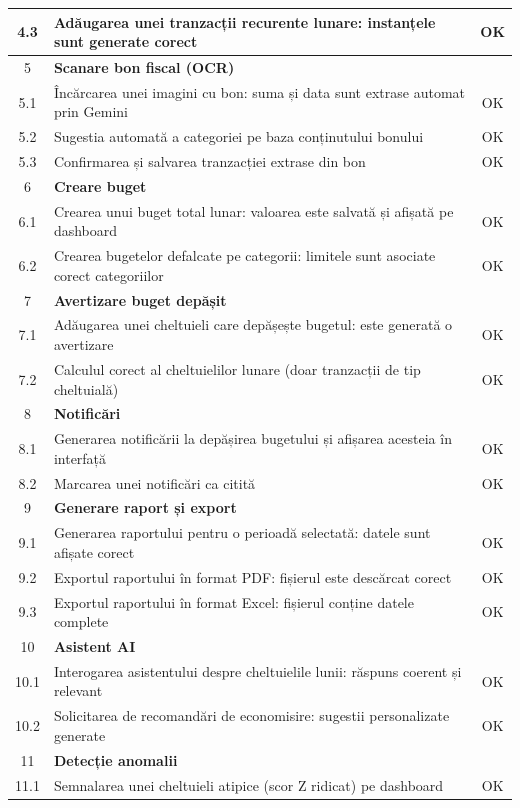 \documentclass[12pt,a4paper,oneside]{report}
\begin{document}
\begin{center}
\begin{longtable}{|c|p{11cm}|c|}
\hline
4.3 & Adăugarea unei tranzacții recurente lunare: instanțele sunt generate corect & OK \\
\hline
5 & \textbf{Scanare bon fiscal (OCR)} & \\
\hline
5.1 & Încărcarea unei imagini cu bon: suma și data sunt extrase automat prin Gemini & OK \\
\hline
5.2 & Sugestia automată a categoriei pe baza conținutului bonului & OK \\
\hline
5.3 & Confirmarea și salvarea tranzacției extrase din bon & OK \\
\hline
6 & \textbf{Creare buget} & \\
\hline
6.1 & Crearea unui buget total lunar: valoarea este salvată și afișată pe dashboard & OK \\
\hline
6.2 & Crearea bugetelor defalcate pe categorii: limitele sunt asociate corect categoriilor & OK \\
\hline
7 & \textbf{Avertizare buget depășit} & \\
\hline
7.1 & Adăugarea unei cheltuieli care depășește bugetul: este generată o avertizare & OK \\
\hline
7.2 & Calculul corect al cheltuielilor lunare (doar tranzacții de tip cheltuială) & OK \\
\hline
8 & \textbf{Notificări} & \\
\hline
8.1 & Generarea notificării la depășirea bugetului și afișarea acesteia în interfață & OK \\
\hline
8.2 & Marcarea unei notificări ca citită & OK \\
\hline
9 & \textbf{Generare raport și export} & \\
\hline
9.1 & Generarea raportului pentru o perioadă selectată: datele sunt afișate corect & OK \\
\hline
9.2 & Exportul raportului în format PDF: fișierul este descărcat corect & OK \\
\hline
9.3 & Exportul raportului în format Excel: fișierul conține datele complete & OK \\
\hline
10 & \textbf{Asistent AI} & \\
\hline
10.1 & Interogarea asistentului despre cheltuielile lunii: răspuns coerent și relevant & OK \\
\hline
10.2 & Solicitarea de recomandări de economisire: sugestii personalizate generate & OK \\
\hline
11 & \textbf{Detecție anomalii} & \\
\hline
11.1 & Semnalarea unei cheltuieli atipice (scor Z ridicat) pe dashboard & OK \\

\end{longtable}
\end{center}
\end{document}
